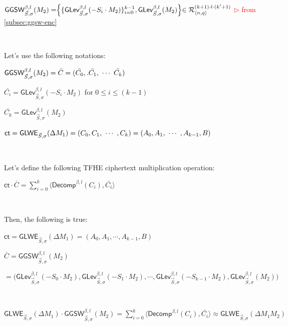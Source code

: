 $ $

$\textsf{GGSW}_{\vec{S}, \sigma}^{\beta, l}(M_2) = \Bigr \{ \{ \textsf{GLev}_{\vec{S}, \sigma}^{\beta, l} (-S_i \cdot M_2)  \}_{i=0}^{k-1}, \textsf{GLev}_{\vec{S}, \sigma}^{\beta, l}(M_2) \Bigl \} \in \mathcal{R}_{\langle n, q \rangle }^{(k+1) \cdot l \cdot (k'+1)}$ \textcolor{red}{ $\rhd$ from \autoref{subsec:ggsw-enc}}

$ $

\noindent Let's use the following notations:

$\textsf{GGSW}_{\vec{S}, \sigma}^{\beta, l}(M_2) = {\bar{C}} = (\bar{C_0},. \bar{C_1}, \text{ } \text{$\cdots$} \text{ } \bar{C_k})$ 

$\bar{C_i} = \textsf{GLev}_{\vec{S}, \sigma}^{\beta, l}(-S_i \cdot M_2)$ for $0 \leq i \leq (k-1)$

$\bar{C_k} = \textsf{GLev}_{\vec{S}, \sigma}^{\beta, l}(M_2)$

$\textsf{ct} = \textsf{GLWE}_{\vec{S}, \sigma}(\Delta M_1) = (C_0, C_1, \text{ } \text{$\cdots$} \text{ }, C_k) = (A_0, A_1, \text{ } \text{$\cdots$} \text{ }, A_{k-1}, B)$

$ $

\noindent Let's define the following TFHE ciphertext multiplication operation: 

$\textsf{ct} \cdot {\bar{C}} = \sum\limits_{i=0}^{k}\langle \textsf{Decomp}^{\beta, l}(C_i), \bar{C_i} \rangle$

$ $

\noindent Then, the following is true:

\begin{tcolorbox}[title={\textbf{\tboxlabel{\ref*{subsubsec:tfhe-glwe-to-ggsw-multiplication}} Generalization to GLWE-to-GGSW Multiplication}}]
$\textsf{ct} = \textsf{GLWE}_{\vec{S}, \sigma}(\Delta M_1) = (A_0, A_1, \cdots, A_{k-1}, B)$

$\bar{C} = \textsf{GGSW}_{\vec{S}, \sigma}^{\beta, l}(M_2)$

$ = \bm(\textsf{GLev}_{\vec{S}, \sigma}^{\beta, l}(-S_0\cdot M_2), \textsf{GLev}_{\vec{S}, \sigma}^{\beta, l}(-S_1\cdot M_2), \cdots, \textsf{GLev}_{\vec{S}, \sigma}^{\beta, l}(-S_{k-1}\cdot M_2), \textsf{GLev}_{\vec{S}, \sigma}^{\beta, l}(M_2)\bm)$

$ $

$\textsf{GLWE}_{\vec{S}, \sigma}(\Delta M_1) \cdot \textsf{GGSW}_{\vec{S}, \sigma}^{\beta, l}(M_2) = \sum\limits_{i=0}^{k}\langle \textsf{Decomp}^{\beta, l}(C_i), \bar{C_i} \rangle \approx \textsf{GLWE}_{\vec{S}, \sigma}(\Delta M_1 M_2)$
\end{tcolorbox}

